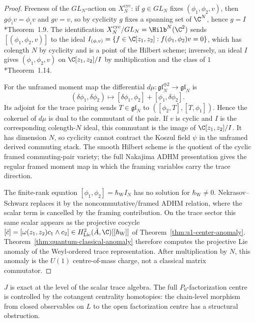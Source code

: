 \documentclass[11pt]{memoir}
\begin{document}
\begin{proof}
  Freeness of the \(GL_N\)-action on \(X^{\mathrm{cyc}}_N\): if
  \(g\in GL_N\) fixes \((\phi_1,\phi_2,v)\), then
  \(g\phi_iv=\phi_iv\) and \(gv=v\), so by cyclicity
  \(g\) fixes a spanning set of \(\C^N\), hence \(g=I\)
  \cite{nakajima-hilbert-lectures}*{Theorem~1.9}.  The identification
  \(X^{\mathrm{cyc}}_N/GL_N=\Hilb^N(\C^2)\) sends
  \([(\phi_1,\phi_2,v)]\) to the ideal
  \(I_{(\phi,v)}=\{f\in\C[z_1,z_2]:f(\phi_1,\phi_2)v=0\}\), which has
  colength \(N\) by cyclicity and is a point of the Hilbert scheme;
  inversely, an ideal \(I\) gives \((\phi_1,\phi_2,v)\) on
  \(\C[z_1,z_2]/I\) by multiplication and the class of \(1\)
  \cite{nakajima-hilbert-lectures}*{Theorem~1.14}.

  For the unframed moment map the differential
  \(d\mu\colon\mathfrak{gl}_N^{\oplus 2}\to\mathfrak{gl}_N\) is
  \[
    (\delta\phi_1,\delta\phi_2)\longmapsto
    [\delta\phi_1,\phi_2]+[\phi_1,\delta\phi_2].
  \]
  Its adjoint for the trace pairing sends \(T\in\mathfrak{gl}_N\) to
  \(([\phi_2,T],[T,\phi_1])\).  Hence the cokernel of \(d\mu\) is dual
  to the commutant of the pair.  If \(v\) is cyclic and \(I\) is the
  corresponding colength-\(N\) ideal, this commutant is the image of
  \(\C[z_1,z_2]/I\).  It has dimension \(N\), so cyclicity cannot
  contract the Koszul field \(\psi\) in the unframed derived
  commuting stack.  The smooth Hilbert scheme is the quotient of the
  cyclic framed commuting-pair variety; the full Nakajima ADHM
  presentation gives the regular framed moment map in which the
  framing variables carry the trace direction.

  The finite-rank equation
  \([\phi_1,\phi_2]=\hbar_{\mathrm{W}} I_N\) has no solution for \(\hbar_{\mathrm{W}}\ne0\).
  Nekrasov--Schwarz replaces it by the noncommutative/framed ADHM
  relation, where the scalar term is cancelled by the framing
  contribution.  On the trace sector this same scalar appears as the
  projective cocycle
  \([\bar c]=[\omega(z_1,z_2)c_1\wedge c_2]\in
  H^2_{\mathrm{Lie}}(\bar A,\C)[[\hbar_{\mathrm{W}}]]\) of
  Theorem~\ref{thm:u1-center-anomaly}.  Theorem~\ref{thm:quantum-classical-anomaly}
  therefore computes the projective Lie anomaly of the Weyl-ordered trace
  representation.  After multiplication by \(N\), this anomaly is
  the \(U(1)\) centre-of-mass charge, not a classical matrix
  commutator.
\end{proof}

\(J\) is exact at the level of the scalar trace algebra.  The full
\(P_0\)-factorization centre is controlled by the cotangent centrality
homotopies: the chain-level morphism from closed observables on \(L\) to
the open factorization centre has a structural obstruction.
\end{document}
